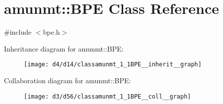\hypertarget{classamunmt_1_1BPE}{}\section{amunmt\+:\+:B\+PE Class Reference}
\label{classamunmt_1_1BPE}


{\ttfamily \#include $<$bpe.\+h$>$}



Inheritance diagram for amunmt\+:\+:B\+PE\+:
\nopagebreak
\begin{figure}[H]
\begin{center}
\leavevmode
\texttt{[image: d4/d14/classamunmt\_1\_1BPE\_\_inherit\_\_graph]}
\end{center}
\end{figure}


Collaboration diagram for amunmt\+:\+:B\+PE\+:
\nopagebreak
\begin{figure}[H]
\begin{center}
\leavevmode
\texttt{[image: d3/d56/classamunmt\_1\_1BPE\_\_coll\_\_graph]}
\end{center}
\end{figure}
